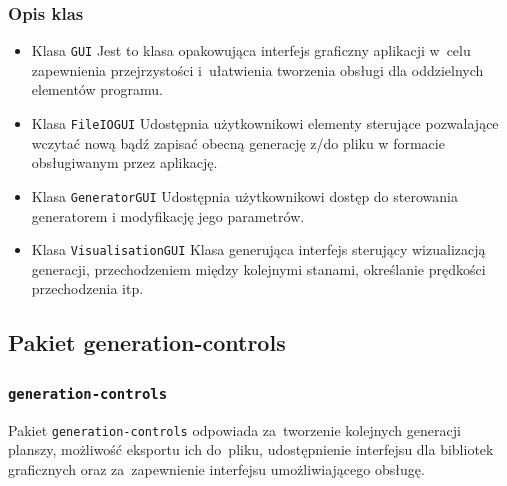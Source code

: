 \documentclass[a4paper,11pt]{article}
\begin{document}
            \subsubsection{Opis klas}
                \begin{itemize}
                 \item Klasa \texttt{GUI} Jest to klasa opakowująca interfejs graficzny aplikacji w~celu zapewnienia przejrzystości i~ułatwienia tworzenia obsługi dla oddzielnych elementów programu.
                 \item Klasa \texttt{FileIOGUI} Udostępnia użytkownikowi elementy sterujące pozwalające wczytać nową bądź zapisać obecną generację z/do pliku w formacie obsługiwanym przez aplikację.
                 \item Klasa \texttt{GeneratorGUI} Udostępnia użytkownikowi dostęp do sterowania generatorem i modyfikację jego parametrów.
                 \item Klasa \texttt{VisualisationGUI} Klasa generująca interfejs sterujący wizualizacją generacji, przechodzeniem między kolejnymi stanami, określanie prędkości przechodzenia itp.
                \end{itemize}

        \subsection{Pakiet generation-controls}
            \subsubsection{\texttt{generation-controls}}
            Pakiet \texttt{generation-controls} odpowiada za~tworzenie kolejnych generacji planszy, możliwość eksportu ich do~pliku, udostępnienie interfejsu dla bibliotek graficznych oraz za~zapewnienie interfejsu umożliwiającego obsługę.
\end{document}
